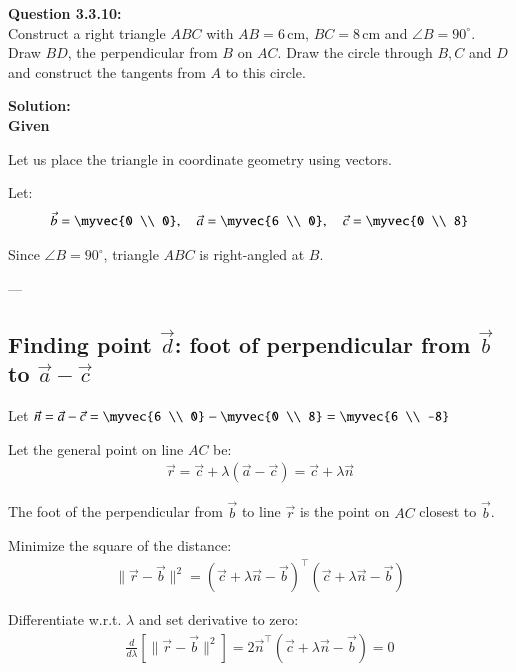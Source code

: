 \documentclass[journal]{IEEEtran}
\begin{document}



\textbf{Question 3.3.10:} \\
\textbf{}  Construct a right triangle $ABC$ with $AB = 6 \, \text{cm}$, 
$BC = 8 \, \text{cm}$ and $\angle B = 90^\circ$. Draw $BD$, the perpendicular 
from $B$ on $AC$. Draw the circle through $B, C$ and $D$ and construct the 
tangents from $A$ to this circle. 


\textbf{Solution:}\\
 \textbf{Given} 
 
Let us place the triangle in coordinate geometry using vectors.

Let:
\begin{align}
\vec{b} = \myvec{0 \\ 0}, \quad \vec{a} = \myvec{6 \\ 0}, \quad \vec{c} = \myvec{0 \\ 8} \label{1}
\end{align}

Since \(\angle B = 90^\circ\), triangle \(ABC\) is right-angled at \(B\).

---

\subsection*{Finding point \( \vec{d} \): foot of perpendicular from \( \vec{b} \) to \( \vec{a} - \vec{c} \)}

Let \(\vec{n} = \vec{a} - \vec{c} = \myvec{6 \\ 0} - \myvec{0 \\ 8} = \myvec{6 \\ -8}\) \label{2}

Let the general point on line \(AC\) be:
\begin{align}
\vec{r} = \vec{c} + \lambda(\vec{a} - \vec{c}) = \vec{c} + \lambda \vec{n} \label{3}
\end{align}

The foot of the perpendicular from \( \vec{b} \) to line \( \vec{r} \) is the point on \(AC\) closest to \(\vec{b}\).

Minimize the square of the distance:
\begin{align}
\| \vec{r} - \vec{b} \|^2 = (\vec{c} + \lambda \vec{n} - \vec{b})^\top (\vec{c} + \lambda \vec{n} - \vec{b}) \label{4}
\end{align}

Differentiate w.r.t. \(\lambda\) and set derivative to zero:
\begin{align}
\frac{d}{d\lambda} \left[ \| \vec{r} - \vec{b} \|^2 \right] = 2\vec{n}^\top (\vec{c} + \lambda \vec{n} - \vec{b}) = 0 \label{5}
\end{align}
\end{document}
